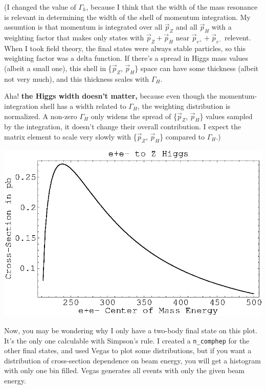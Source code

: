 \documentclass{article}
\begin{document}
(I changed the value of $\Gamma_h$, because I think that the width of
the mass resonance is relevant in determining the width of the shell
of momentum integration.  My assumtion is that momentum is integrated
over all $\vec{p}_Z$ and all $\vec{p}_H$ with a weighting factor that
makes only states with $\vec{p}_Z + \vec{p}_H$ near
$\vec{p}_{e^+} + \vec{p}_{e^-}$ relevent.  When I took field theory,
the final states were always stable particles, so this weighting
factor was a delta function.  If there's a spread in Higgs mass values
(albeit a small one), this shell in \{$\vec{p}_Z$, $\vec{p}_H$\} space
can have some thickness (albeit not very much), and this thickness
scales with $\Gamma_H$.

Aha!  {\bf the Higgs width doesn't matter,} because even though the
momentum-integration shell has a width related to $\Gamma_H$, the
weighting distribution is normalized.  A non-zero $\Gamma_H$ only
widens the spread of \{$\vec{p}_Z$, $\vec{p}_H$\} values sampled by
the integration, it doesn't change their overall contribution.  I
expect the matrix element to scale very slowly with
\{$\vec{p}_Z$, $\vec{p}_H$\} compared to $\Gamma_H$.)

\begin{center}
  \includegraphics[width=\linewidth]{prod_zh.eps}
\end{center}

Now, you may be wondering why I only have a two-body final state on
this plot.  It's the only one calculable with Simpson's rule.  I
created a {\tt n\_comphep} for the other final states, and used Vegas
to plot some distributions, but if you want a distribution of
cross-section dependence on beam energy, you will get a histogram with
only one bin filled.  Vegas generates all events with only the given
beam energy.
\end{document}
